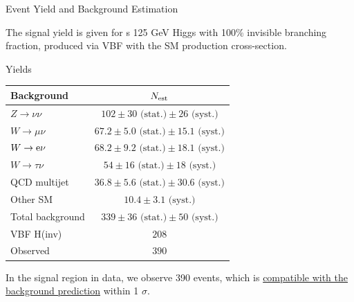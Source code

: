\documentclass[8pt]{beamer}
\newcommand{\stat}{\text{ (stat.)}}
\newcommand{\syst}{\text{ (syst.)}}
\begin{document}
\begin{frame}{Event Yield and Background Estimation}

The signal yield is given for s 125 GeV Higgs with 100\% invisible branching fraction, produced via VBF with the SM production cross-section.

\begin{block}{Yields}

\begin{table}[th!]
\centering
\begin{tabular}{|l|c|}
\hline
Background 	 		& $N_{\rm est}$ \\
\hline
$Z \rightarrow \nu\nu$ 		& $102 \pm 30 \stat \pm 26 \syst$	\\
$W \rightarrow \mu\nu$ 	 	& $67.2 \pm 5.0 \stat \pm 15.1 \syst$ 	\\
$W \rightarrow {\rm e} \nu$  	& $68.2 \pm 9.2 \stat \pm 18.1 \syst$	\\
$W \rightarrow \tau \nu$ 	& $54 \pm 16 \stat \pm 18 \syst$ \\
QCD multijet 	 		& $36.8 \pm 5.6 \stat \pm 30.6 \syst$ \\
Other SM			& $10.4 \pm 3.1 \syst$ \\
\hline
Total background		& $339 \pm 36 \stat \pm 50 \syst$  \\
VBF H(inv)                      & $208$ \\
Observed 			& $390$  \\	
\hline
\end{tabular}
\end{table}

\end{block}

In the signal region in data, we observe 390 events, which is \uline{compatible with the background prediction} within 1 $\sigma$.

\end{frame}
\end{document}
